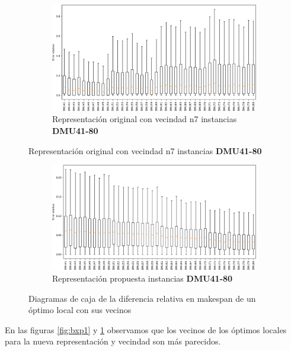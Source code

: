 \begin{figure}[H]
    \begin{subfigure}{\textwidth}
        \centering
        \includegraphics[scale=.6]{Imagenes/bxpn7_2.png}
        \caption{Representación original con vecindad n7 instancias \textbf{DMU41-80}}
    \end{subfigure}
\end{figure}
\begin{figure}[H]\ContinuedFloat
    \begin{subfigure}{\textwidth}
        \centering
        \includegraphics[scale=.6]{Imagenes/bxppr_2.png}
        \caption{Representación propuesta instancias \textbf{DMU41-80}}
    \end{subfigure}
    \caption{Diagramas de caja de la diferencia relativa en makespan de un óptimo local con sus vecinos}
    \label{fig:bxp2}
\end{figure}

En las figuras \ref{fig:bxp1} y \ref{fig:bxp2} observamos que los vecinos de los óptimos locales para la nueva representación y vecindad son más parecidos.
